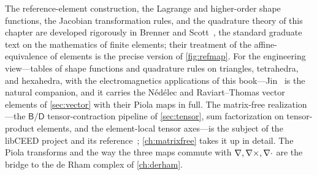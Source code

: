 \furtherreading
The reference-element construction, the Lagrange and higher-order shape functions, the
Jacobian transformation rules, and the quadrature theory of this chapter are developed
rigorously in Brenner and Scott~\citep{brennerscott2008}, the standard graduate text on
the mathematics of finite elements; their treatment of the affine-equivalence of
elements is the precise version of \cref{fig:refmap}. For the engineering view---tables
of shape functions and quadrature rules on triangles, tetrahedra, and hexahedra, with
the electromagnetics applications of this book---Jin~\citep{jin2014} is the natural
companion, and it carries the N\'ed\'elec and Raviart--Thomas vector elements of
\cref{sec:vector} with their Piola maps in full. The matrix-free realization---the
$\mathsf{B}$/$\mathsf{D}$ tensor-contraction pipeline of \cref{sec:tensor}, sum
factorization on tensor-product elements, and the element-local tensor axes---is the
subject of the libCEED project and its reference~\citep{ceed2021}; \cref{ch:matrixfree}
takes it up in detail. The Piola transforms and the way the three maps commute with
$\nabla,\nabla\times,\nabla\cdot$ are the bridge to the de Rham complex of \cref{ch:derham}.

